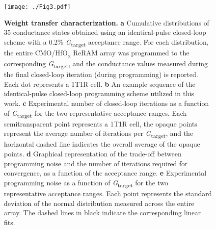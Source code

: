 \begin{figure}[H]
\centering
\texttt{[image: ./Fig3.pdf]}
\caption{\textbf{Weight transfer characterization.} \textbf{a} Cumulative distributions of 35 conductance states obtained using an identical-pulse closed-loop scheme with a 0.2\% \textit{G}\textsubscript{\textnormal{target}} acceptance range. For each distribution, the entire CMO/HfO\textsubscript{\textnormal{x}} ReRAM array was programmed to the corresponding \textit{G}\textsubscript{\textnormal{target}}, and the conductance values measured during the final closed-loop iteration (during programming) is reported. Each dot represents a 1T1R cell. \textbf{b} An example sequence of the identical-pulse closed-loop programming scheme utilized in this work. \textbf{c} Experimental number of closed-loop iterations as a function of \textit{G}\textsubscript{\textnormal{target}} for the two representative acceptance ranges. Each semitransparent point represents a 1T1R cell, the opaque points represent the average number of iterations per \textit{G}\textsubscript{\textnormal{target}}, and the horizontal dashed line indicates the overall average of the opaque points. \textbf{d} Graphical representation of the trade-off between programming noise and the number of iterations required for convergence, as a function of the acceptance range. \textbf{e} Experimental programming noise as a function of \textit{G}\textsubscript{\textnormal{target}} for the two representative acceptance ranges. 
Each point represents the standard deviation of the normal distribution measured across the entire array. The dashed lines in black indicate the corresponding linear fits.}
\label{fig3}
\end{figure}

